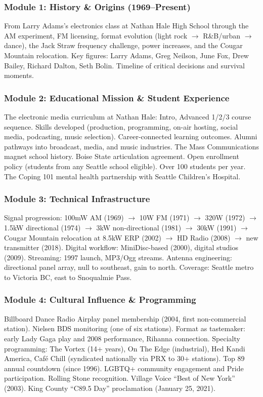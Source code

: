 \documentclass[11pt,letterpaper]{article}
\begin{document}
\subsubsection{Module 1: History \& Origins (1969--Present)}
From Larry Adams's electronics class at Nathan Hale High School through the AM experiment, FM licensing, format evolution (light rock $\rightarrow$ R\&B/urban $\rightarrow$ dance), the Jack Straw frequency challenge, power increases, and the Cougar Mountain relocation. Key figures: Larry Adams, Greg Neilson, June Fox, Drew Bailey, Richard Dalton, Seth Bolin. Timeline of critical decisions and survival moments.

\subsubsection{Module 2: Educational Mission \& Student Experience}
The electronic media curriculum at Nathan Hale: Intro, Advanced 1/2/3 course sequence. Skills developed (production, programming, on-air hosting, social media, podcasting, music selection). Career-connected learning outcomes. Alumni pathways into broadcast, media, and music industries. The Mass Communications magnet school history. Boise State articulation agreement. Open enrollment policy (students from any Seattle school eligible). Over 100 students per year. The Coping 101 mental health partnership with Seattle Children's Hospital.

\subsubsection{Module 3: Technical Infrastructure}
Signal progression: 100mW AM (1969) $\rightarrow$ 10W FM (1971) $\rightarrow$ 320W (1972) $\rightarrow$ 1.5kW directional (1974) $\rightarrow$ 3kW non-directional (1981) $\rightarrow$ 30kW (1991) $\rightarrow$ Cougar Mountain relocation at 8.5kW ERP (2002) $\rightarrow$ HD Radio (2008) $\rightarrow$ new transmitter (2018). Digital workflow: MiniDisc-based (2000), digital studios (2009). Streaming: 1997 launch, MP3/Ogg streams. Antenna engineering: directional panel array, null to southeast, gain to north. Coverage: Seattle metro to Victoria BC, east to Snoqualmie Pass.

\subsubsection{Module 4: Cultural Influence \& Programming}
Billboard Dance Radio Airplay panel membership (2004, first non-commercial station). Nielsen BDS monitoring (one of six stations). Format as tastemaker: early Lady Gaga play and 2008 performance, Rihanna connection. Specialty programming: The Vortex (14+ years), On The Edge (industrial), Hed Kandi America, Café Chill (syndicated nationally via PRX to 30+ stations). Top 89 annual countdown (since 1996). LGBTQ+ community engagement and Pride participation. Rolling Stone recognition. Village Voice ``Best of New York'' (2003). King County ``C89.5 Day'' proclamation (January 25, 2021).
\end{document}
